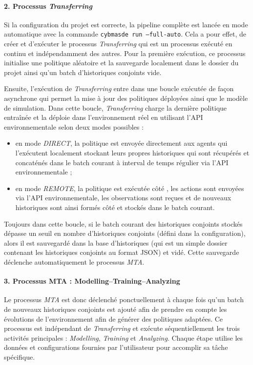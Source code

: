 \paragraph{2. Processus \textit{Transferring}}

Si la configuration du projet est correcte, la pipeline complète est lancée en mode automatique avec la commande \texttt{cybmasde run --full-auto}. Cela a pour effet, de créer et d’exécuter le processus \textit{Transferring} qui est un processus exécuté en continu et indépendamment des autres. Pour la première exécution, ce processus initialise une politique aléatoire et la sauvegarde localement dans le dossier du projet ainsi qu'un batch d'historiques conjoints vide.

Ensuite, l'exécution de \textit{Transferring} entre dans une boucle exécutée de façon asynchrone qui permet la mise à jour des politiques déployées ainsi que le modèle de simulation. Dans cette boucle, \textit{Transferring} charge la dernière politique entraînée et la déploie dans l'environnement réel en utilisant l'API environnementale selon deux modes possibles :
\begin{itemize}
  \item en mode \textit{DIRECT}, la politique est envoyée directement aux agents qui l'exécutent localement stockant leurs propres historiques qui sont récupérés et concaténés dans le batch courant à interval de temps régulier via l'API environnementale ;
  \item en mode \textit{REMOTE}, la politique est exécutée côté , les actions sont envoyées via l'API environnementale, les observations sont reçues et de nouveaux historiques sont ainsi formés côté  et stockés dans le batch courant.
\end{itemize}

Toujours dans cette boucle, si le batch courant des historiques conjoints stockés dépasse un seuil en nombre d'historiques conjoints (défini dans la configuration), alors il est sauvegardé dans la base d'historiques (qui est un simple dossier contenant les historiques conjoints au format JSON) et vidé. Cette sauvegarde déclenche automatiquement le processus \textit{MTA}.

\paragraph{3. Processus MTA : Modelling–Training–Analyzing}

Le processus \textit{MTA} est donc déclenché ponctuellement à chaque fois qu'un batch de nouveaux historiques conjoints est ajouté afin de prendre en compte les évolutions de l'environnement afin de générer des politiques adaptées. Ce processus est indépendant de \textit{Transferring} et exécute séquentiellement les trois activités principales : \textit{Modelling}, \textit{Training} et \textit{Analyzing}. Chaque étape utilise les données et configurations fournies par l'utilisateur pour accomplir sa tâche spécifique.


